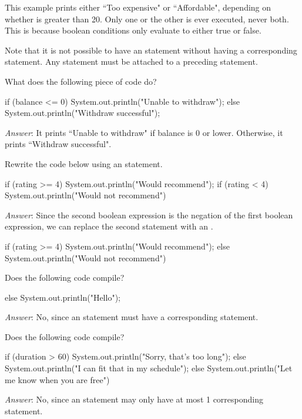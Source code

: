 \noindent This example prints either ``Too expensive" or ``Affordable", depending on whether  is greater than 20. Only one or the other is ever executed, never both. This is because boolean conditions only evaluate to either true or false.

Note that it is not possible to have an  statement without having a corresponding  statement. Any  statement must be attached to a preceding  statement. 

\begin{example}
What does the following piece of code do?

\begin{code}
if (balance <= 0) {
    System.out.println("Unable to withdraw");
} else {
    System.out.println("Withdraw successful");
}
\end{code}

\emph{Answer}: It prints ``Unable to withdraw" if balance is 0 or lower. Otherwise, it prints ``Withdraw successful".
\end{example}

\begin{example}
Rewrite the code below using an  statement.

\begin{code}
if (rating >= 4) {
    System.out.println("Would recommend");
} if (rating < 4) {
    System.out.println("Would not recommend")
}
\end{code}

\emph{Answer}: Since the second boolean expression is the negation of the first boolean expression, we can replace the second  statement with an .
\begin{code}
if (rating >= 4) {
    System.out.println("Would recommend");
} else {
    System.out.println("Would not recommend")
}
\end{code}
\end{example}

\begin{example}
Does the following code compile?

\begin{code}
else {
    System.out.println("Hello");
}
\end{code}

\emph{Answer}: No, since an  statement must have a corresponding  statement.
\end{example}

\begin{example}
Does the following code compile?

\begin{code}
if (duration > 60) {
    System.out.println("Sorry, that's too long");
} else {
    System.out.println("I can fit that in my schedule");
} else {
    System.out.println("Let me know when you are free")
}
\end{code}

\emph{Answer}: No, since an  statement may only have at most 1 corresponding  statement.
\end{example}

